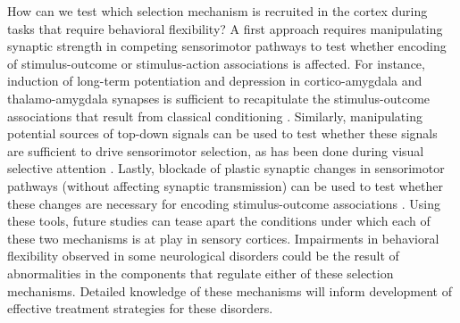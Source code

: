 How can we test which selection mechanism is recruited in the cortex during tasks that require behavioral flexibility? A first approach requires manipulating synaptic strength in competing sensorimotor pathways to test whether encoding of stimulus-outcome or stimulus-action associations is affected. For instance, induction of long-term potentiation and depression in cortico-amygdala and thalamo-amygdala synapses is sufficient to recapitulate the stimulus-outcome associations that result from classical conditioning \citep{Nabavi2014}. Similarly, manipulating potential sources of top-down signals can be used to test whether these signals are sufficient to drive sensorimotor selection, as has been done during visual selective attention \citep{Moore2003, Moore2004}. Lastly, blockade of plastic synaptic changes in sensorimotor pathways (without affecting synaptic transmission) can be used to test whether these changes are necessary for encoding stimulus-outcome associations \citep{Kraus2002, Quirk2008, Johansen2014}.
%
Using these tools, future studies can tease apart the conditions under which each of these two mechanisms is at play in sensory cortices. 
%
Impairments in behavioral flexibility observed in some neurological disorders \citep{Goldberg1988,Morice1990,Hill2004} could be the result of abnormalities in the components that regulate either of these selection mechanisms.  
%
Detailed knowledge of these mechanisms will inform development of effective treatment strategies for these disorders.


